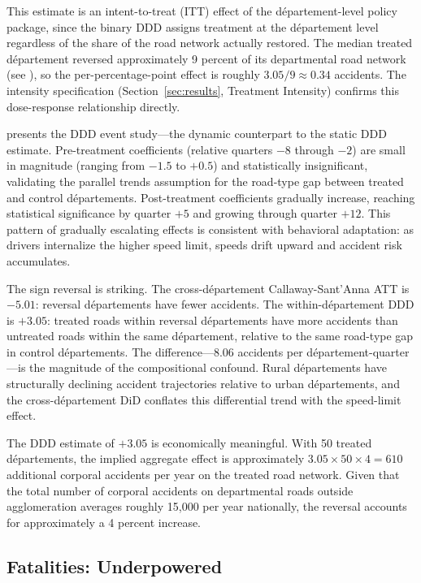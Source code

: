 \documentclass[12pt]{article}
\begin{document}
This estimate is an intent-to-treat (ITT) effect of the d\'{e}partement-level policy package, since the binary DDD assigns treatment at the d\'{e}partement level regardless of the share of the road network actually restored. The median treated d\'{e}partement reversed approximately 9 percent of its departmental road network (see ), so the per-percentage-point effect is roughly $3.05 / 9 \approx 0.34$ accidents. The intensity specification (Section~\ref{sec:results}, Treatment Intensity) confirms this dose-response relationship directly.

 presents the DDD event study---the dynamic counterpart to the static DDD estimate. Pre-treatment coefficients (relative quarters $-8$ through $-2$) are small in magnitude (ranging from $-1.5$ to $+0.5$) and statistically insignificant, validating the parallel trends assumption for the road-type gap between treated and control d\'{e}partements. Post-treatment coefficients gradually increase, reaching statistical significance by quarter $+5$ and growing through quarter $+12$. This pattern of gradually escalating effects is consistent with behavioral adaptation: as drivers internalize the higher speed limit, speeds drift upward and accident risk accumulates.

The sign reversal is striking. The cross-d\'{e}partement Callaway-Sant'Anna ATT is $-5.01$: reversal d\'{e}partements have fewer accidents. The within-d\'{e}partement DDD is $+3.05$: treated roads within reversal d\'{e}partements have more accidents than untreated roads within the same d\'{e}partement, relative to the same road-type gap in control d\'{e}partements. The difference---$8.06$ accidents per d\'{e}partement-quarter---is the magnitude of the compositional confound. Rural d\'{e}partements have structurally declining accident trajectories relative to urban d\'{e}partements, and the cross-d\'{e}partement DiD conflates this differential trend with the speed-limit effect.

The DDD estimate of $+3.05$ is economically meaningful. With 50 treated d\'{e}partements, the implied aggregate effect is approximately $3.05 \times 50 \times 4 = 610$ additional corporal accidents per year on the treated road network. Given that the total number of corporal accidents on departmental roads outside agglomeration averages roughly 15,000 per year nationally, the reversal accounts for approximately a 4 percent increase.

\subsection{Fatalities: Underpowered}
\end{document}
